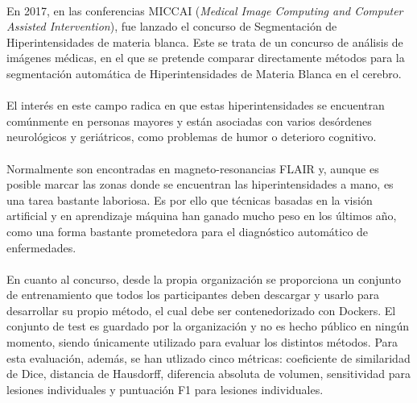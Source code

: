 \documentclass[12pt]{article}
\begin{document}
	\paragraph{}
	En 2017, en las conferencias MICCAI (\textit{Medical Image Computing and Computer Assisted Intervention}), fue lanzado el concurso de Segmentación de Hiperintensidades de materia blanca. Este se trata de un concurso de análisis de imágenes médicas, en el que se pretende comparar directamente métodos para la segmentación automática de Hiperintensidades de Materia Blanca en el cerebro.

	\paragraph{}
	El interés en este campo radica en que estas hiperintensidades se encuentran comúnmente en personas mayores y están asociadas con varios desórdenes neurológicos y geriátricos, como problemas de humor o deterioro cognitivo.

	\paragraph{}
	Normalmente son encontradas en magneto-resonancias FLAIR y, aunque es posible marcar las zonas donde se encuentran las hiperintensidades a mano, es una tarea bastante laboriosa. Es por ello que técnicas basadas en la visión artificial y en aprendizaje máquina han ganado mucho peso en los últimos año, como una forma bastante prometedora para el diagnóstico automático de enfermedades.

	\paragraph{}
	En cuanto al concurso, desde la propia organización se proporciona un conjunto de entrenamiento que todos los participantes deben descargar y usarlo para desarrollar su propio método, el cual debe ser contenedorizado con Dockers. El conjunto de test es guardado por la organización y no es hecho público en ningún momento, siendo únicamente utilizado para evaluar los distintos métodos. Para esta evaluación, además,  se han utlizado cinco métricas: coeficiente de similaridad de Dice, distancia de Hausdorff, diferencia absoluta de volumen, sensitividad para lesiones individuales y puntuación F1 para lesiones individuales.
	
\end{document}
